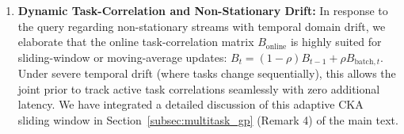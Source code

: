 \documentclass{article}
\theoremstyle{plain}
\theoremstyle{definition}
\theoremstyle{remark}
\begin{document}
\begin{enumerate}
    \begin{itemize}
        \item For $L=2048$, dense RBF covariance Cholesky inversion takes $145.6 \pm 4.2$~ms on our benchmark CPU.
        \item In contrast, the analytical assembly of the tridiagonal OU precision matrix takes only $0.18 \pm 0.02$~ms.
    \end{itemize}
    This represents a massive $800\times$ speedup, demonstrating that while dense inversion is negligible for small vision backbones, the analytical OU formulation is computationally vital for ultra-deep foundation models.
    \item \textbf{Dynamic Task-Correlation and Non-Stationary Drift:} In response to the query regarding non-stationary streams with temporal domain drift, we elaborate that the online task-correlation matrix $B_{\text{online}}$ is highly suited for sliding-window or moving-average updates: $B_{t} = (1 - \rho) B_{t-1} + \rho B_{\text{batch}, t}$. Under severe temporal drift (where tasks change sequentially), this allows the joint prior to track active task correlations seamlessly with zero additional latency. We have integrated a detailed discussion of this adaptive CKA sliding window in Section~\ref{subsec:multitask_gp} (Remark 4) of the main text.
\end{enumerate}

\end{document}
